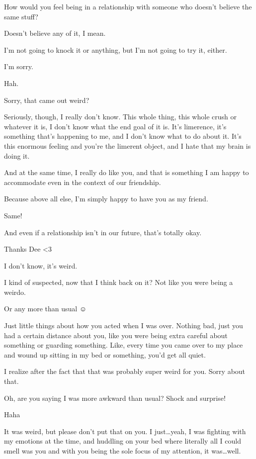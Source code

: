  How would you feel being in a relationship with someone who doesn't believe the same stuff?

 Doesn't believe any of it, I mean.

 I'm not going to knock it or anything, but I'm not going to try it, either.

 I'm sorry.

 Hah.

 Sorry, that came out weird?

 Seriously, though, I really don't know. This whole thing, this whole crush or whatever it is, I don't know what the end goal of it is. It's limerence, it's something that's happening to me, and I don't know what to do about it. It's this enormous feeling and you're the limerent object, and I hate that my brain is doing it.

 And at the same time, I really do like you, and that is something I am happy to accommodate even in the context of our friendship.

 Because above all else, I'm simply happy to have you as my friend.

 Same!

 And even if a relationship isn't in our future, that's totally okay.

 Thanks Dee \textless3

 I don't know, it's weird.

 I kind of suspected, now that I think back on it? Not like you were being a weirdo.

 Or any more than usual ☺

 Just little things about how you acted when I was over. Nothing bad, just you had a certain distance about you, like you were being extra careful about something or guarding something. Like, every time you came over to my place and wound up sitting in my bed or something, you'd get all quiet.

 I realize after the fact that that was probably super weird for you. Sorry about that.

 Oh, are you saying I was more awkward than usual? Shock and surprise!

 Haha

 It was weird, but please don't put that on you. I just\ldots yeah, I was fighting with my emotions at the time, and huddling on your bed where literally all I could smell was you and with you being the sole focus of my attention, it was\ldots well.

